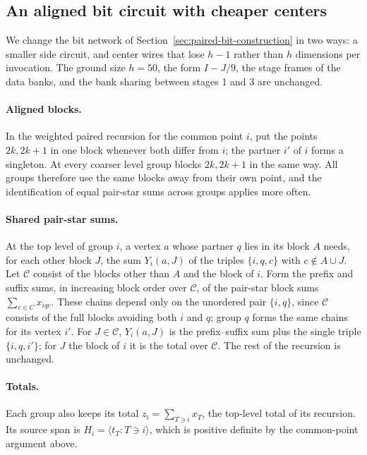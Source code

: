 \subsection{An aligned bit circuit with cheaper centers}
\label{sec:aligned-bit}
We change the bit network of Section~\ref{sec:paired-bit-construction} in
two ways: a smaller side circuit, and center wires that lose $h-1$ rather
than $h$ dimensions per invocation. The ground size $h=50$, the form
$I-J/9$, the stage frames of the data banks, and the bank sharing between
stages 1 and 3 are unchanged.

\paragraph{Aligned blocks.} In the weighted paired recursion for the common
point $i$, put the points $2k,2k+1$ in one block whenever both differ from
$i$; the partner $i'$ of $i$ forms a singleton. At every coarser level group
blocks $2k,2k+1$ in the same way. All groups therefore use the same blocks
away from their own point, and the identification of equal pair-star sums
across groups applies more often.

\paragraph{Shared pair-star sums.} At the top level of group $i$, a vertex
$a$ whose partner $q$ lies in its block $A$ needs, for each other block $J$,
the sum $Y_i(a,J)$ of the triples $\{i,q,c\}$ with $c\notin A\cup J$. Let
$\mathcal C$ consist of the blocks other than $A$ and the block of $i$. Form
the prefix and suffix sums, in increasing block order over $\mathcal C$, of
the pair-star block sums $\sum_{c\in C}x_{iqc}$. These chains depend only on
the unordered pair $\{i,q\}$, since $\mathcal C$ consists of the full blocks
avoiding both $i$ and $q$; group $q$ forms the same chains for its vertex
$i'$. For $J\in\mathcal C$, $Y_i(a,J)$ is the prefix--suffix sum plus the
single triple $\{i,q,i'\}$; for $J$ the block of $i$ it is the total over
$\mathcal C$. The rest of the recursion is unchanged.

\paragraph{Totals.} Each group also keeps its total
$z_i=\sum_{T\ni i}x_T$, the top-level total of its recursion. Its source span
is $H_i=\langle t_T:T\ni i\rangle$, which is positive definite by the
common-point argument above.


